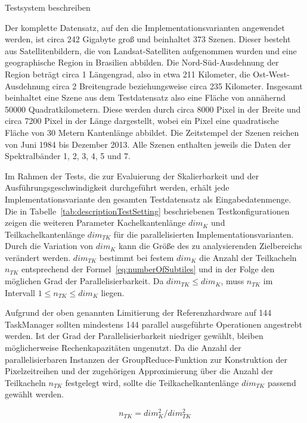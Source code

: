 Testsystem beschreiben 

Der komplette Datensatz, auf den die Implementationsvarianten angewendet werden, ist circa 242 Gigabyte groß und beinhaltet 373 Szenen. Dieser besteht aus Satellitenbildern, die von Landsat-Satelliten aufgenommen wurden und eine geographische Region in Brasilien abbilden. Die Nord-Süd-Ausdehnung der Region beträgt circa 1 Längengrad, also in etwa 211 Kilometer, die Ost-West-Ausdehnung circa 2 Breitengrade beziehungsweise circa 235 Kilometer. Insgesamt beinhaltet eine Szene aus dem Testdatensatz also eine Fläche von annähernd 50000 Quadratkilometern. Diese werden durch circa 8000 Pixel in der Breite und circa 7200 Pixel in der Länge dargestellt, wobei ein Pixel eine quadratische Fläche von 30 Metern Kantenlänge abbildet. Die Zeitstempel der Szenen reichen von Juni 1984 bis Dezember 2013. Alle Szenen enthalten jeweils die Daten der Spektralbänder 1, 2, 3, 4, 5 und 7.

Im Rahmen der Tests, die zur Evaluierung der Skalierbarkeit und der Ausführungsgeschwindigkeit durchgeführt werden, erhält jede Implementationsvariante den gesamten Testdatensatz als Eingabedatenmenge. Die in Tabelle~\ref{tab:descriptionTestSetting} beschriebenen Testkonfigurationen zeigen die weiteren Parameter Kachelkantenlänge $dim_K$  und Teilkachelkantenlänge $dim_{TK}$ für die parallelisierten Implementationsvarianten. Durch die Variation von $dim_K$ kann die Größe des zu analysierenden Zielbereichs verändert werden. $dim_{TK}$ bestimmt bei festem $dim_K$ die Anzahl der Teilkacheln $n_{TK}$ entsprechend der Formel~\ref{eq:numberOfSubtiles} und in der Folge den möglichen Grad der Parallelisierbarkeit. Da $dim_{TK} \leq dim_K$, muss $n_{TK}$ im Intervall $1 \leq n_{TK} \leq dim_K$ liegen. 

Aufgrund der oben genannten Limitierung der Referenzhardware auf 144 TaskManager sollten mindestens 144 parallel ausgeführte Operationen angestrebt werden. Ist der Grad der Parallelisierbarkeit niedriger gewählt, bleiben möglicherweise Rechenkapazitäten ungenutzt. Da die Anzahl der parallelisierbaren Instanzen der GroupReduce-Funktion zur Konstruktion der Pixelzeitreihen und der zugehörigen Approximierung über die Anzahl der Teilkacheln $n_{TK}$ festgelegt wird, sollte die Teilkachelkantenlänge $dim_{TK}$ passend gewählt werden.

\begin{equation} \label{eq:numberOfSubtiles}
n_{TK} = {dim_{K}^2} / {dim_{TK}^2}
\end{equation}


